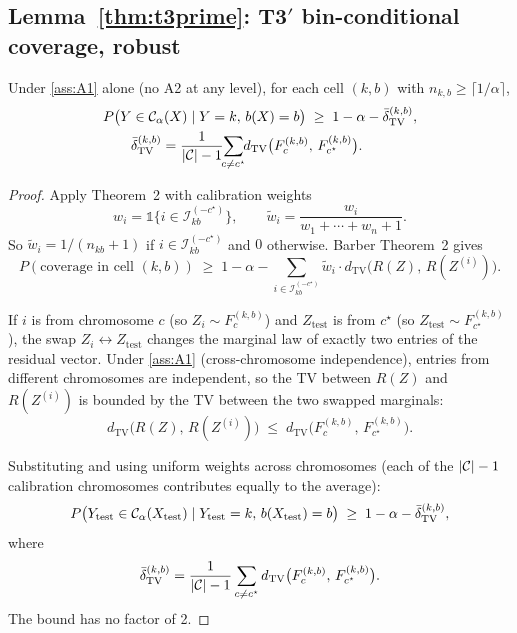 \subsection{Lemma~\ref{thm:t3prime}: T3$'$ bin-conditional coverage, robust}
\label{app:proofs:t3prime}

\begin{lemma}
\label{thm:t3prime}
Under \ref{ass:A1} alone (no A2 at any level), for each cell $(k, b)$ with $n_{k,b} \geq \lceil 1/\alpha\rceil$,
\begin{align*}
&P\bigl(Y \in \mathcal{C}_\alpha(X) \mid Y = k,\, b(X) = b\bigr) \;\geq\; 1 - \alpha - \bar\delta_{\mathrm{TV}}^{(k,b)}, \\
&\qquad \bar\delta_{\mathrm{TV}}^{(k,b)} = \frac{1}{|\mathcal{C}| - 1}\!\!\sum_{c \neq c^\star}\!\! d_{\mathrm{TV}}\bigl(F_c^{(k,b)},\, F_{c^\star}^{(k,b)}\bigr).
\end{align*}
\end{lemma}

\begin{proof}
Apply \citet{barber2023exchangeability} Theorem~2 with calibration weights
\[
w_i = \mathbb{1}\{i \in \mathcal{I}_{kb}^{(-c^\star)}\}, \qquad
\tilde w_i = \frac{w_i}{w_1 + \cdots + w_n + 1}.
\]
So $\tilde w_i = 1/(n_{kb} + 1)$ if $i \in \mathcal{I}_{kb}^{(-c^\star)}$ and $0$ otherwise. Barber Theorem~2 gives
\[
P(\text{coverage in cell } (k, b))
\;\geq\; 1 - \alpha - \sum_{i \in \mathcal{I}_{kb}^{(-c^\star)}} \tilde w_i \cdot d_{\mathrm{TV}}\bigl(R(Z),\, R(Z^{(i)})\bigr).
\]

If $i$ is from chromosome $c$ (so $Z_i \sim F_c^{(k,b)}$) and $Z_{\mathrm{test}}$ is from $c^\star$ (so $Z_{\mathrm{test}} \sim F_{c^\star}^{(k,b)}$), the swap $Z_i \leftrightarrow Z_{\mathrm{test}}$ changes the marginal law of exactly two entries of the residual vector. Under \ref{ass:A1} (cross-chromosome independence), entries from different chromosomes are independent, so the TV between $R(Z)$ and $R(Z^{(i)})$ is bounded by the TV between the two swapped marginals:
\[
d_{\mathrm{TV}}\bigl(R(Z),\, R(Z^{(i)})\bigr) \;\leq\; d_{\mathrm{TV}}\bigl(F_c^{(k,b)},\, F_{c^\star}^{(k,b)}\bigr).
\]

Substituting and using uniform weights across chromosomes (each of the $|\mathcal{C}| - 1$ calibration chromosomes contributes equally to the average):
\[
P\bigl(Y_{\mathrm{test}} \in \mathcal{C}_\alpha(X_{\mathrm{test}}) \mid Y_{\mathrm{test}} = k,\, b(X_{\mathrm{test}}) = b\bigr)
\;\geq\; 1 - \alpha - \bar\delta_{\mathrm{TV}}^{(k,b)},
\]
where
\[
\bar\delta_{\mathrm{TV}}^{(k,b)} = \frac{1}{|\mathcal{C}| - 1} \sum_{c \neq c^\star} d_{\mathrm{TV}}\bigl(F_c^{(k,b)},\, F_{c^\star}^{(k,b)}\bigr).
\]
The bound has no factor of 2.
\end{proof}

